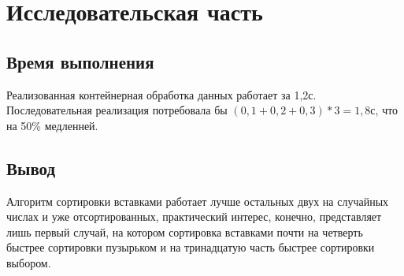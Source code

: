 \chapter{Исследовательская часть}

\section{Время выполнения}

Реализованная контейнерная обработка данных работает за 1,2с. Последовательная реализация потребовала бы $(0,1 + 0,2 + 0,3) * 3 = 1,8\text{с}$, что на 50\% медленней.

\section*{Вывод}

Алгоритм сортировки вставками работает лучше остальных двух на случайных числах и уже отсортированных, практический интерес, конечно, представляет лишь первый случай,
на котором сортировка вставками почти на четверть быстрее сортировки пузырьком и на тринадцатую часть быстрее сортировки выбором.
